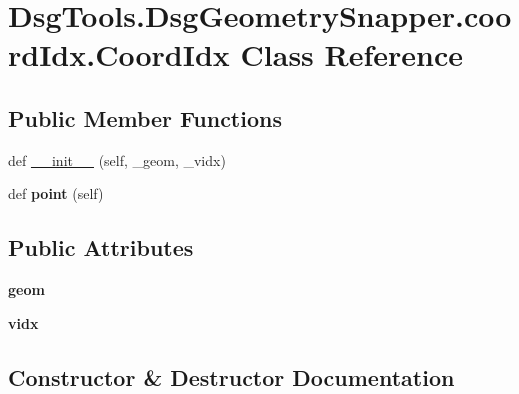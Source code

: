 \hypertarget{class_dsg_tools_1_1_dsg_geometry_snapper_1_1coord_idx_1_1_coord_idx}{}\section{Dsg\+Tools.\+Dsg\+Geometry\+Snapper.\+coord\+Idx.\+Coord\+Idx Class Reference}
\label{class_dsg_tools_1_1_dsg_geometry_snapper_1_1coord_idx_1_1_coord_idx}
\subsection*{Public Member Functions}
\begin{DoxyCompactItemize}
\item 
def \mbox{\hyperlink{class_dsg_tools_1_1_dsg_geometry_snapper_1_1coord_idx_1_1_coord_idx_afb9a49fe84a8460284de4c6b4e9db807}{\+\_\+\+\_\+init\+\_\+\+\_\+}} (self, \+\_\+geom, \+\_\+vidx)
\item 
\mbox{\label{class_dsg_tools_1_1_dsg_geometry_snapper_1_1coord_idx_1_1_coord_idx_afca21ecaaff59b3fd043944afdfd5168}} 
def {\bfseries point} (self)
\end{DoxyCompactItemize}
\subsection*{Public Attributes}
\begin{DoxyCompactItemize}
\item 
\mbox{\label{class_dsg_tools_1_1_dsg_geometry_snapper_1_1coord_idx_1_1_coord_idx_a1826436c494a22887fa620b215a13ec4}} 
{\bfseries geom}
\item 
\mbox{\label{class_dsg_tools_1_1_dsg_geometry_snapper_1_1coord_idx_1_1_coord_idx_a5e74ae03a67e6c628bb0170af1682bb6}} 
{\bfseries vidx}
\end{DoxyCompactItemize}


\subsection{Constructor \& Destructor Documentation}
\mbox{\label{class_dsg_tools_1_1_dsg_geometry_snapper_1_1coord_idx_1_1_coord_idx_afb9a49fe84a8460284de4c6b4e9db807}} 
